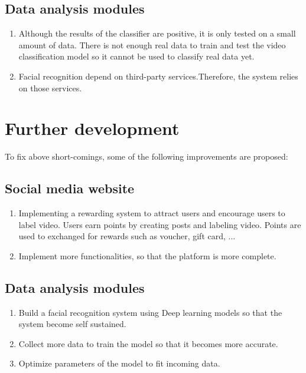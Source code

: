 \subsection{Data analysis modules}
\begin{enumerate}

\item Although the results of the classifier are positive, it is only tested on a small amount of data. There is not enough real data to train and test the video classification model so it cannot be used to classify real data yet.
\item Facial recognition depend on third-party services.Therefore, the system relies on those services.

\end{enumerate}
\section{Further development}
To fix above short-comings, some of the following improvements are proposed:
\subsection{Social media website}\begin{enumerate}
\item Implementing a rewarding system to attract users and encourage users to label video. Users earn points by creating posts and labeling video. Points are used to exchanged for rewards such as voucher, gift card, ...
\item Implement more functionalities, so that the platform is more complete.
\end{enumerate}
\subsection{Data analysis modules}
\begin{enumerate}
\item Build a facial recognition system using Deep learning models so that the system become self sustained.
\item Collect more data to train the model so that it becomes more accurate.
\item Optimize parameters of the model to fit incoming data.
\end{enumerate}

